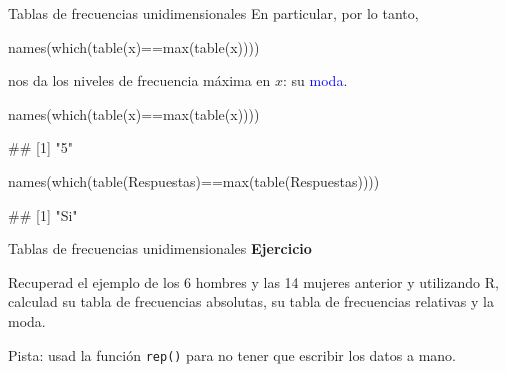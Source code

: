 \documentclass[
  ignorenonframetext,
  aspectratio=169]{beamer}
\newenvironment{Shaded}{\begin{snugshade}}{\end{snugshade}}
\newcommand{\FunctionTok}[1]{\textcolor[rgb]{0.00,0.00,0.00}{#1}}
\newcommand{\NormalTok}[1]{#1}
\newcommand{\SpecialCharTok}[1]{\textcolor[rgb]{0.00,0.00,0.00}{#1}}
\let\oldverbatim\verbatim
\let\endoldverbatim\endverbatim
\renewenvironment{verbatim}{\tiny\oldverbatim}{\endoldverbatim}
\newcommand\blue[1]{\textcolor{blue}{#1}}
\begin{document}
\begin{frame}[fragile]{Tablas de frecuencias unidimensionales}
\protect\hypertarget{tablas-de-frecuencias-unidimensionales-13}{}
En particular, por lo tanto,

\begin{verbatim}
names(which(table(x)==max(table(x))))
\end{verbatim}

nos da los niveles de frecuencia máxima en \(x\): su \blue{moda}.

\begin{Shaded}
\begin{Highlighting}[]
\FunctionTok{names}\NormalTok{(}\FunctionTok{which}\NormalTok{(}\FunctionTok{table}\NormalTok{(x)}\SpecialCharTok{==}\FunctionTok{max}\NormalTok{(}\FunctionTok{table}\NormalTok{(x))))}
\end{Highlighting}
\end{Shaded}

\begin{verbatim}
## [1] "5"
\end{verbatim}

\begin{Shaded}
\begin{Highlighting}[]
\FunctionTok{names}\NormalTok{(}\FunctionTok{which}\NormalTok{(}\FunctionTok{table}\NormalTok{(Respuestas)}\SpecialCharTok{==}\FunctionTok{max}\NormalTok{(}\FunctionTok{table}\NormalTok{(Respuestas))))}
\end{Highlighting}
\end{Shaded}

\begin{verbatim}
## [1] "Si"
\end{verbatim}
\end{frame}

\begin{frame}[fragile]{Tablas de frecuencias unidimensionales}
\protect\hypertarget{tablas-de-frecuencias-unidimensionales-14}{}
\textbf{Ejercicio}

Recuperad el ejemplo de los 6 hombres y las 14 mujeres anterior y
utilizando R, calculad su tabla de frecuencias absolutas, su tabla de
frecuencias relativas y la moda.

Pista: usad la función \texttt{rep()} para no tener que escribir los
datos a mano.
\end{frame}
\end{document}

